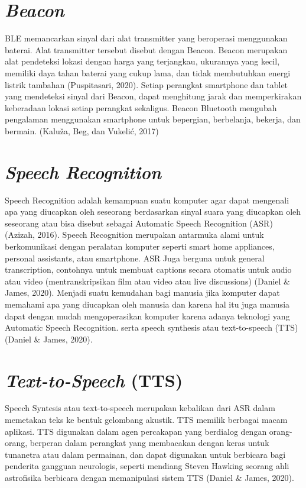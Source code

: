 \section{\textit{Beacon}}
BLE memancarkan sinyal dari alat transmitter yang beroperasi menggunakan baterai. Alat transmitter tersebut disebut dengan Beacon. Beacon merupakan alat pendeteksi lokasi dengan harga yang terjangkau, ukurannya yang kecil, memiliki daya tahan baterai yang cukup lama, dan tidak membutuhkan energi listrik tambahan (Puspitasari, 2020). Setiap perangkat smartphone dan tablet yang mendeteksi sinyal dari Beacon, dapat menghitung jarak dan memperkirakan keberadaan lokasi setiap perangkat sekaligus. Beacon Bluetooth mengubah pengalaman menggunakan smartphone untuk bepergian, berbelanja, bekerja, dan bermain. (Kaluža, Beg, dan Vukelić, 2017)

\section{\textit{Speech Recognition}}
Speech Recognition adalah kemampuan suatu komputer agar dapat mengenali apa yang diucapkan oleh seseorang berdasarkan sinyal suara yang diucapkan oleh seseorang atau bisa disebut sebagai Automatic Speech Recognition (ASR) (Azizah, 2016). Speech Recognition merupakan antarmuka alami untuk berkomunikasi dengan peralatan komputer seperti smart home appliances, personal assistants, atau smartphone. ASR Juga berguna untuk general transcription, contohnya untuk membuat captions secara otomatis untuk audio atau video (mentranskripsikan film atau video atau live discussions) (Daniel & James, 2020). Menjadi suatu kemudahan bagi manusia jika komputer dapat memahami apa yang diucapkan oleh manusia dan karena hal itu juga manusia dapat dengan mudah mengoperasikan komputer karena adanya teknologi yang Automatic Speech Recognition. serta speech synthesis atau text-to-speech (TTS) (Daniel & James, 2020).

\section{\textit{Text-to-Speech }(TTS)}
Speech Syntesis atau text-to-speech merupakan kebalikan dari ASR dalam memetakan teks ke bentuk gelombang akustik. TTS memilik berbagai macam aplikasi. TTS digunakan dalam agen percakapan yang berdialog dengan orang-orang, berperan dalam perangkat yang membacakan dengan keras untuk tunanetra atau dalam permainan, dan dapat digunakan untuk berbicara bagi penderita gangguan neurologis, seperti mendiang Steven Hawking seorang ahli astrofisika berbicara dengan memanipulasi sistem TTS (Daniel & James, 2020).


